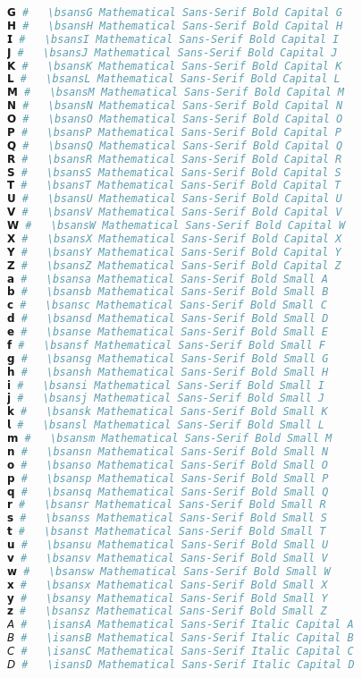 \begin{lstlisting}[language=Julia, style=julia]
𝗚 #   \bsansG Mathematical Sans-Serif Bold Capital G
𝗛 #   \bsansH Mathematical Sans-Serif Bold Capital H
𝗜 #   \bsansI Mathematical Sans-Serif Bold Capital I
𝗝 #   \bsansJ Mathematical Sans-Serif Bold Capital J
𝗞 #   \bsansK Mathematical Sans-Serif Bold Capital K
𝗟 #   \bsansL Mathematical Sans-Serif Bold Capital L
𝗠 #   \bsansM Mathematical Sans-Serif Bold Capital M
𝗡 #   \bsansN Mathematical Sans-Serif Bold Capital N
𝗢 #   \bsansO Mathematical Sans-Serif Bold Capital O
𝗣 #   \bsansP Mathematical Sans-Serif Bold Capital P
𝗤 #   \bsansQ Mathematical Sans-Serif Bold Capital Q
𝗥 #   \bsansR Mathematical Sans-Serif Bold Capital R
𝗦 #   \bsansS Mathematical Sans-Serif Bold Capital S
𝗧 #   \bsansT Mathematical Sans-Serif Bold Capital T
𝗨 #   \bsansU Mathematical Sans-Serif Bold Capital U
𝗩 #   \bsansV Mathematical Sans-Serif Bold Capital V
𝗪 #   \bsansW Mathematical Sans-Serif Bold Capital W
𝗫 #   \bsansX Mathematical Sans-Serif Bold Capital X
𝗬 #   \bsansY Mathematical Sans-Serif Bold Capital Y
𝗭 #   \bsansZ Mathematical Sans-Serif Bold Capital Z
𝗮 #   \bsansa Mathematical Sans-Serif Bold Small A
𝗯 #   \bsansb Mathematical Sans-Serif Bold Small B
𝗰 #   \bsansc Mathematical Sans-Serif Bold Small C
𝗱 #   \bsansd Mathematical Sans-Serif Bold Small D
𝗲 #   \bsanse Mathematical Sans-Serif Bold Small E
𝗳 #   \bsansf Mathematical Sans-Serif Bold Small F
𝗴 #   \bsansg Mathematical Sans-Serif Bold Small G
𝗵 #   \bsansh Mathematical Sans-Serif Bold Small H
𝗶 #   \bsansi Mathematical Sans-Serif Bold Small I
𝗷 #   \bsansj Mathematical Sans-Serif Bold Small J
𝗸 #   \bsansk Mathematical Sans-Serif Bold Small K
𝗹 #   \bsansl Mathematical Sans-Serif Bold Small L
𝗺 #   \bsansm Mathematical Sans-Serif Bold Small M
𝗻 #   \bsansn Mathematical Sans-Serif Bold Small N
𝗼 #   \bsanso Mathematical Sans-Serif Bold Small O
𝗽 #   \bsansp Mathematical Sans-Serif Bold Small P
𝗾 #   \bsansq Mathematical Sans-Serif Bold Small Q
𝗿 #   \bsansr Mathematical Sans-Serif Bold Small R
𝘀 #   \bsanss Mathematical Sans-Serif Bold Small S
𝘁 #   \bsanst Mathematical Sans-Serif Bold Small T
𝘂 #   \bsansu Mathematical Sans-Serif Bold Small U
𝘃 #   \bsansv Mathematical Sans-Serif Bold Small V
𝘄 #   \bsansw Mathematical Sans-Serif Bold Small W
𝘅 #   \bsansx Mathematical Sans-Serif Bold Small X
𝘆 #   \bsansy Mathematical Sans-Serif Bold Small Y
𝘇 #   \bsansz Mathematical Sans-Serif Bold Small Z
𝘈 #   \isansA Mathematical Sans-Serif Italic Capital A
𝘉 #   \isansB Mathematical Sans-Serif Italic Capital B
𝘊 #   \isansC Mathematical Sans-Serif Italic Capital C
𝘋 #   \isansD Mathematical Sans-Serif Italic Capital D

\end{lstlisting}
